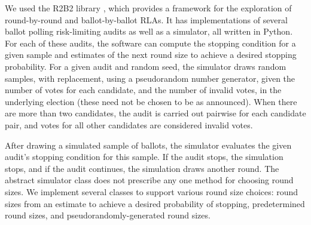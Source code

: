 We used the R2B2 library \cite{r2b2}, which provides a framework for the exploration of round-by-round
and ballot-by-ballot RLAs. It has implementations of several ballot polling risk-limiting audits as well as a simulator, 
all written in Python. For each of these audits, the software can compute the stopping condition for a given sample and estimates
of the next round size to achieve a desired stopping probability. 
For a given audit and random seed, the simulator draws random samples, with replacement, using a pseudorandom number generator, given the number of votes for each candidate, and the number of invalid votes, in the underlying election (these need not be chosen to be as announced). When there are more than two candidates, the audit is carried out pairwise for each candidate pair, and votes for all other candidates are considered invalid votes. 

After drawing a simulated sample of ballots, the simulator evaluates the given audit's stopping condition for this sample.
If the audit stops, the simulation stops, and if the audit continues, the simulation draws another round. 
The abstract simulator class does not prescribe any one method for choosing round sizes. 
We implement several classes to support various round size choices: 
round sizes from an estimate to achieve a desired probability of stopping, 
predetermined round sizes, and pseudorandomly-generated round sizes. 
